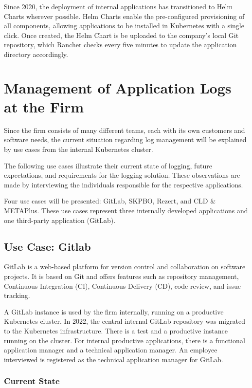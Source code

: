 \documentclass[../main.tex]{subfiles}
\begin{document}
Since 2020, the deployment of internal applications has transitioned to Helm Charts \cite{helm} wherever possible. Helm Charts enable the pre-configured provisioning of all components, allowing applications to be installed in Kubernetes with a single click. Once created, the Helm Chart is be uploaded to the company's local Git repository, which Rancher checks every five minutes to update the application directory accordingly.

\section{Management of Application Logs at the Firm}

Since the firm consists of many different teams, each with its own customers and software needs, the current situation regarding log management will be explained by use cases from the internal Kubernetes cluster.  

The following use cases illustrate their current state of logging, future expectations, and requirements for the logging solution. These observations are made by interviewing the individuals responsible for the respective applications. 

Four use cases will be presented: GitLab, SKPBO, Rezert, and CLD \& METAPlus. These use cases represent three internally developed applications and one third-party application (GitLab).

\subsection{Use Case: Gitlab}

GitLab is a web-based platform for version control and collaboration on software projects. It is based on Git and offers features such as repository management, Continuous Integration (CI), Continuous Delivery (CD), code review, and issue tracking. \cite{gitlab}

A GitLab instance is used by the firm internally, running on a productive Kubernetes cluster. In 2022, the central internal GitLab repository was migrated to the Kubernetes infrastructure. There is a test and a productive instance running on the cluster. For internal productive applications, there is a functional application manager and a technical application manager. An employee interviewed is registered as the technical application manager for GitLab.

\subsubsection{Current State}
\end{document}
